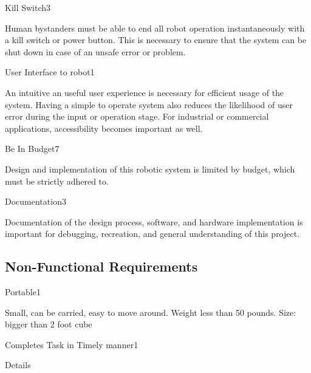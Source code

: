 \begin{functional_requirement}{Kill Switch}{3}
\item Human bystanders must be able to end all robot operation instantaneously with a kill switch or power button. This is necessary to ensure that the system can be shut down in case of an unsafe error or problem.
\end{functional_requirement}

\begin{functional_requirement}{User Interface to robot}{1}
\item An intuitive an useful user experience is necessary for efficient usage of the system. Having a simple to operate system also reduces the likelihood of user error during the input or operation stage. For industrial or commercial applications, accessibility becomes important as well. 
\end{functional_requirement}

\begin{functional_requirement}{Be In Budget}{7}
\item Design and implementation of this robotic system is limited by budget, which must be strictly adhered to.
\end{functional_requirement}

\begin{functional_requirement}{Documentation}{3}
\item Documentation of the design process, software, and hardware implementation is important for debugging, recreation, and general understanding of this project.
\end{functional_requirement}


\subsection{Non-Functional Requirements}
\label{sec:nonfunctional_requirements}

\begin{nonfunctional_requirement}{Portable}{1}
\item Small, can be carried, easy to move around. Weight less than 50 pounds. Size: bigger than 2 foot cube
\end{nonfunctional_requirement}

\begin{nonfunctional_requirement}{Completes Task in Timely manner}{1}
\item Details
\end{nonfunctional_requirement}

